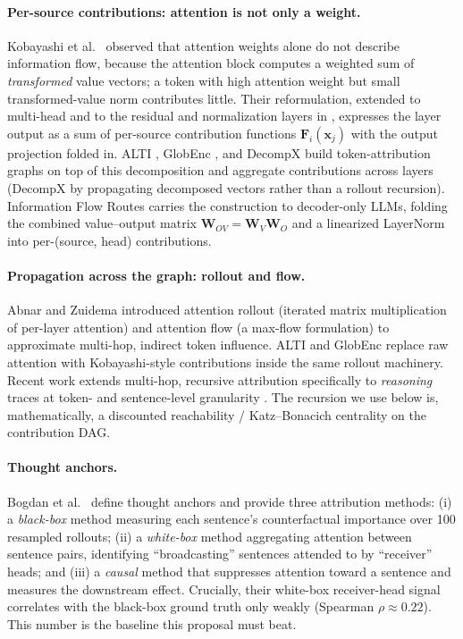 \documentclass[11pt]{article}
\newcommand{\WO}{\mathbf{W}_O}
\newcommand{\WV}{\mathbf{W}_V}
\begin{document}
\paragraph{Per-source contributions: attention is not only a weight.}
Kobayashi et al.\ \cite{kobayashi2020attention} observed that attention weights alone do not
describe information flow, because the attention block computes a weighted sum of
\emph{transformed} value vectors; a token with high attention weight but small transformed-value
norm contributes little. Their reformulation, extended to multi-head and to the residual and
normalization layers in \cite{kobayashi2021incorporating}, expresses the layer output as a sum of
per-source contribution functions $\mathbf{F}_i(\mathbf{x}_j)$ with the output projection folded in.
ALTI \cite{ferrando2022measuring}, GlobEnc \cite{modarressi2022globenc}, and DecompX
\cite{modarressi2023decompx} build token-attribution graphs on top of this decomposition and
aggregate contributions across layers (DecompX by propagating decomposed vectors rather than a
rollout recursion). Information Flow Routes \cite{ferrando2024information} carries the construction
to decoder-only LLMs, folding the combined value--output matrix $\mathbf{W}_{OV}=\WV\WO$ and a
linearized LayerNorm into per-(source, head) contributions.

\paragraph{Propagation across the graph: rollout and flow.}
Abnar and Zuidema \cite{abnar2020quantifying} introduced attention rollout (iterated matrix
multiplication of per-layer attention) and attention flow (a max-flow formulation) to approximate
multi-hop, indirect token influence. ALTI and GlobEnc replace raw attention with Kobayashi-style
contributions inside the same rollout machinery. Recent work extends multi-hop, recursive
attribution specifically to \emph{reasoning} traces at token- and sentence-level granularity
\cite{ferrando2024information}. The recursion we use below is, mathematically, a discounted
reachability / Katz--Bonacich centrality \cite{katz1953new} on the contribution DAG.

\paragraph{Thought anchors.}
Bogdan et al.\ \cite{bogdan2025thought} define thought anchors and provide three attribution
methods: (i) a \emph{black-box} method measuring each sentence's counterfactual importance over
100 resampled rollouts; (ii) a \emph{white-box} method aggregating attention between sentence
pairs, identifying ``broadcasting'' sentences attended to by ``receiver'' heads; and (iii) a
\emph{causal} method that suppresses attention toward a sentence and measures the downstream
effect. Crucially, their white-box receiver-head signal correlates with the black-box ground truth
only weakly (Spearman $\rho \approx 0.22$). This number is the baseline this proposal must beat.
\end{document}
